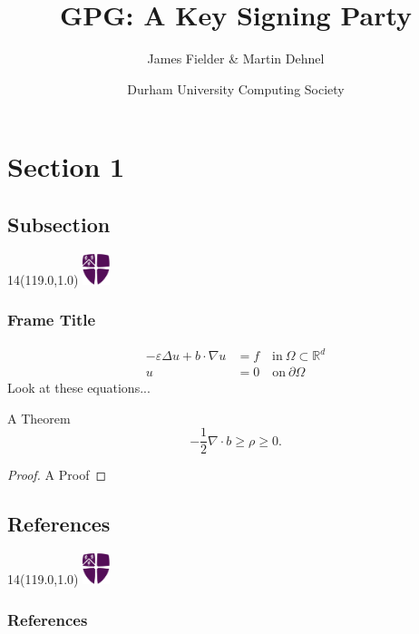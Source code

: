\documentclass[xcolor=dvipsnames,usepdftitle=false]{beamer}
\title[GPG Key Signing Party]{GPG: A Key Signing Party}
\author{James Fielder \& Martin Dehnel}
\institute[Durham]{}
\date[14 May 2012]{Durham University Computing Society}
\institute[Durham]{\includegraphics[height=1.5cm]{pictures/logo_purple.eps}}
\newcommand{\MyLogo}{%
	\begin{textblock}{14}(119.0,1.0) %
		\includegraphics[width=0.8cm]{pictures/logo_only.eps}
	\end{textblock}
}
\renewcommand\epsilon{\varepsilon}
\newcommand{\pO}{{\partial \Omega}}
\newcommand{\half}[0]{\ensuremath{\frac{1}{2}}}
\begin{document}
\frame[plain]{\titlepage}


\section{Section 1}

\subsection*{Subsection} %

\begin{frame}
	\MyLogo
	\frametitle{Frame Title}
	\begin{equation} 
		\begin{split}
		-\epsilon \Delta u + b \cdot \nabla u & = f  \quad \mathrm{in}~ \Omega \subset \mathbb{R}^d  \nonumber\\
		u & = 0   \quad \mathrm{on}~ \pO \nonumber
		\end{split}
	\end{equation}
	Look at these equations...

	\begin{theorem}
		A Theorem
		\begin{equation}
			- \half \nabla \cdot b \ge \rho \ge 0. \nonumber
		\end{equation}
	\end{theorem}
	\begin{proof}
		A Proof
	\end{proof}

\end{frame}


\subsection*{References}

\begin{frame}
	\MyLogo
	\frametitle{References}
	\tiny{
	
	} %
\end{frame}
\end{document}
